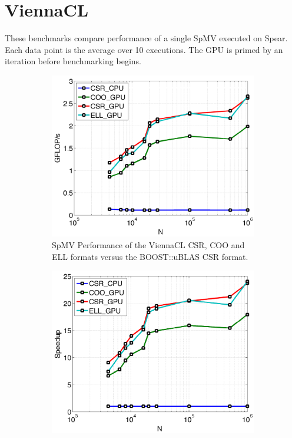 \section{ViennaCL}

These benchmarks compare performance of a single SpMV executed on Spear. Each data point is the average over 10 executions. The GPU is primed by an iteration before benchmarking begins. 

\begin{figure}
\centering
\begin{subfigure}[t]{0.48\textwidth}
\centering
\includegraphics[width=1.0\textwidth]{../figures/spear_results/spmv/spmv_vcl_gflops-eps-converted-to.pdf}
\caption{SpMV Performance of the ViennaCL CSR, COO and ELL formats versus the BOOST::uBLAS CSR format. }
\label{fig:spear_vcl_gflops}
\end{subfigure} 
\begin{subfigure}[t]{0.48\textwidth}
\centering
\includegraphics[width=1.0\textwidth]{../figures/spear_results/spmv/spmv_vcl_speedup-eps-converted-to.pdf}

\end{subfigure}
\end{figure}
